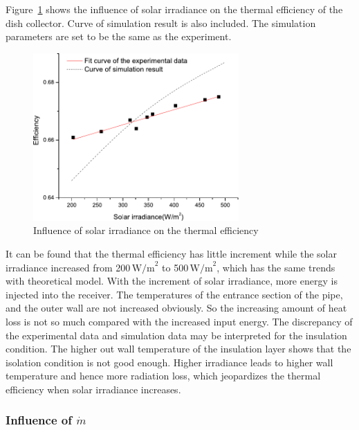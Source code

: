 Figure~\ref{fig:I_r-eta} shows the influence of solar irradiance on the thermal efficiency of the dish collector. Curve of simulation result is also included. The simulation parameters are set to be the same as the experiment. 
\begin{figure}[!ht]
\centering
\includegraphics[width=0.7\textwidth]{fig/I_r-eta}
\caption{Influence of solar irradiance on the thermal efficiency}
\label{fig:I_r-eta}
\end{figure}

It can be found that the thermal efficiency has little increment while the solar irradiance increased from 200$\,\mathrm{W/m}^2$ to 500$\,\mathrm{W/m}^2$, which has the same trends with theoretical model. With the increment of solar irradiance, more energy is injected into the receiver. The temperatures of the entrance section of the pipe, and the outer wall are not increased obviously. So the increasing amount of heat loss is not so much compared with the increased input energy. 
The discrepancy of the experimental data and simulation data may be interpreted for the insulation condition. The higher out wall temperature of the insulation layer shows that the isolation condition is not good enough. Higher irradiance leads to higher wall temperature and hence more radiation loss, which jeopardizes the thermal efficiency when solar irradiance increases.


\subsubsection{Influence of $\dot{m}$}

